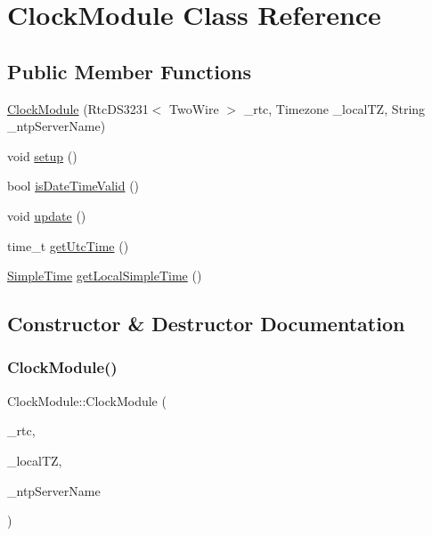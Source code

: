 \hypertarget{class_clock_module}{}\section{Clock\+Module Class Reference}
\label{class_clock_module}
\subsection*{Public Member Functions}
\begin{DoxyCompactItemize}
\item 
\mbox{\hyperlink{class_clock_module_a13599210b0032bbc5312d93e690c763b}{Clock\+Module}} (Rtc\+D\+S3231$<$ Two\+Wire $>$ \+\_\+rtc, Timezone \+\_\+local\+TZ, String \+\_\+ntp\+Server\+Name)
\item 
void \mbox{\hyperlink{class_clock_module_a6113cfe778efff0aa237696f85516796}{setup}} ()
\item 
bool \mbox{\hyperlink{class_clock_module_a05053d7409ef43d1729113a7912fa866}{is\+Date\+Time\+Valid}} ()
\item 
void \mbox{\hyperlink{class_clock_module_afbc823bb09d912dbdc25f9d38ec78624}{update}} ()
\item 
time\+\_\+t \mbox{\hyperlink{class_clock_module_af0faab0171ded0fdb37dcbff757f451e}{get\+Utc\+Time}} ()
\item 
\mbox{\hyperlink{class_simple_time}{Simple\+Time}} \mbox{\hyperlink{class_clock_module_aa208cd29a002d60e4e5f064813acf9f3}{get\+Local\+Simple\+Time}} ()
\end{DoxyCompactItemize}


\subsection{Constructor \& Destructor Documentation}
\mbox{\label{class_clock_module_a13599210b0032bbc5312d93e690c763b}} 
\subsubsection{\texorpdfstring{ClockModule()}{ClockModule()}}
{\footnotesize\ttfamily Clock\+Module\+::\+Clock\+Module (\begin{DoxyParamCaption}\item[{Rtc\+D\+S3231$<$ Two\+Wire $>$}]{\+\_\+rtc,  }\item[{Timezone}]{\+\_\+local\+TZ,  }\item[{String}]{\+\_\+ntp\+Server\+Name }\end{DoxyParamCaption})}

